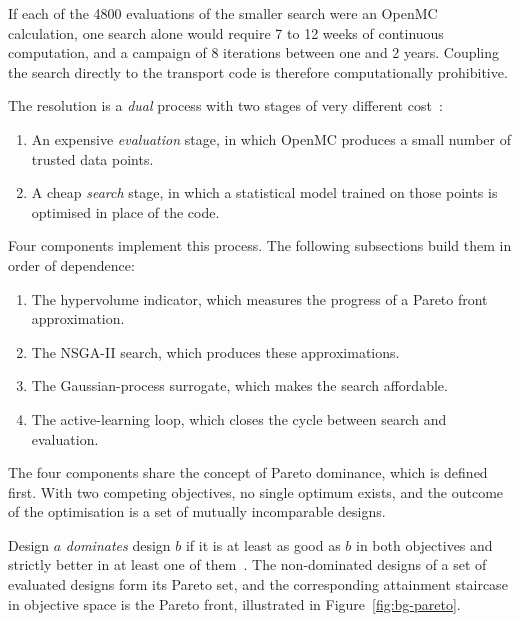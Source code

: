 If each of the 4800 evaluations of the smaller search were an OpenMC
calculation, one search
alone would require 7 to 12 weeks of continuous computation, and
a campaign of 8 iterations between one and 2 years. Coupling the
search directly to the transport code is therefore computationally
prohibitive.

The resolution is a \emph{dual} process with two stages of very
different cost~\cite{forrester_book_2008}:

\begin{enumerate}
  \item An expensive \emph{evaluation} stage, in which OpenMC produces
        a small number of trusted data points.

  \item A cheap \emph{search} stage, in which a statistical model
        trained on those points is optimised in place of the code.
\end{enumerate}

Four components implement this process. The following subsections build
them in order of dependence:

\begin{enumerate}
  \item The hypervolume indicator, which measures the progress of a Pareto front approximation.

  \item The NSGA-II search, which produces these approximations.

  \item The Gaussian-process surrogate, which makes the search
        affordable.

  \item The active-learning loop, which closes the cycle between search
        and evaluation.
\end{enumerate}

The four components share the concept of Pareto dominance, which is
defined first. With two competing objectives, no single optimum exists, and the outcome of the
optimisation is a set of mutually incomparable designs.

Design $a$ \emph{dominates} design $b$ if it is at least as good as $b$
in both objectives and strictly better in at least one of
them~\cite{miettinen_1999,deb_2001}. The non-dominated designs of a set of evaluated designs form its Pareto set, and the
corresponding attainment staircase in objective space is the Pareto
front, illustrated in Figure~\ref{fig:bg-pareto}.

